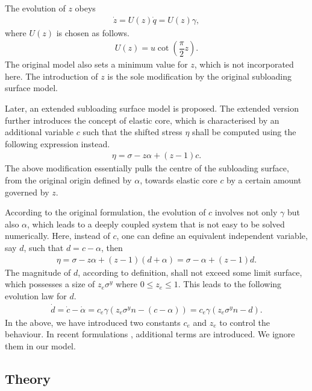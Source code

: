 The evolution of $z$ obeys
\begin{gather}
\dot{z}=U\left(z\right)\dot{q}=U\left(z\right)\gamma,
\end{gather}
where $U\left(z\right)$ is chosen as follows.
\begin{gather}
U\left(z\right)=u\cot\left(\dfrac{\pi}{2}z\right).
\end{gather}
The original model also sets a minimum value for $z$, which is not incorporated here.
The introduction of $z$ is the sole modification by the original subloading surface model.

Later, an extended subloading surface model is proposed.
The extended version further introduces the concept of elastic core, which is characterised by an additional variable $c$ such that the shifted stress $\eta$ shall be computed using the following expression instead.
\begin{gather}
\eta=\sigma-z\alpha+\left(z-1\right)c.
\end{gather}
The above modification essentially pulls the centre of the subloading surface, from the original origin defined by $\alpha$, towards elastic core $c$ by a certain amount governed by $z$.

According to the original formulation, the evolution of $c$ involves not only $\gamma$ but also $\alpha$, which leads to a deeply coupled system that is not easy to be solved numerically.
Here, instead of $c$, one can define an equivalent independent variable, say $d$, such that $d=c-\alpha$, then
\begin{gather}
\eta=\sigma-z\alpha+\left(z-1\right)\left(d+\alpha\right)=\sigma-\alpha+\left(z-1\right)d.
\end{gather}
The magnitude of $d$, according to definition, shall not exceed some limit surface, which possesses a size of $z_e\sigma^y$ where $0\leqslant{}z_e\leqslant1$.
This leads to the following evolution law for $d$.
\begin{gather}
\dot{d}=\dot{c}-\dot{\alpha}=c_e\gamma\left(z_e\sigma^yn-\left(c-\alpha\right)\right)=c_e\gamma\left(z_e\sigma^yn-d\right).
\end{gather}
In the above, we have introduced two constants $c_e$ and $z_e$ to control the behaviour.
In recent formulations \cite{Hashiguchi2023}, additional terms are introduced.
We ignore them in our model.
\subsection{Theory}
